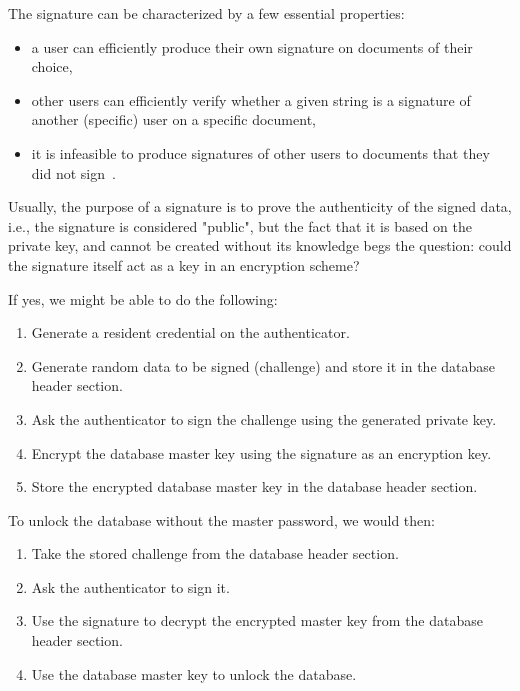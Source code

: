 The signature can be characterized by a few essential properties:

\begin{itemize}
	\item a user can efficiently produce their own signature on documents of their choice,
	\item other users can efficiently verify whether a given string is a signature of another (specific) user on a specific document,
	\item it is infeasible to produce signatures of other users to documents that they did not sign~\cite{the-foundations-of-cryptograpgy:vol-2}.
\end{itemize}

Usually, the purpose of a signature is to prove the authenticity of the signed data, i.e., the signature is considered
"public", but the fact that it is based on the private key, and cannot be created without its knowledge begs the question:
could the signature itself act as a key in an encryption scheme?

If yes, we might be able to do the following:

\begin{enumerate}
	\item Generate a resident credential on the authenticator.
	\item Generate random data to be signed (challenge) and store it in the database header section.
	\item Ask the authenticator to sign the challenge using the generated private key.
	\item Encrypt the database master key using the signature as an encryption key.
	\item Store the encrypted database master key in the database header section.
\end{enumerate}

To unlock the database without the master password, we would then:

\begin{enumerate}
	\item Take the stored challenge from the database header section.
	\item Ask the authenticator to sign it.
	\item Use the signature to decrypt the encrypted master key from the database header section.
	\item Use the database master key to unlock the database.
\end{enumerate}

